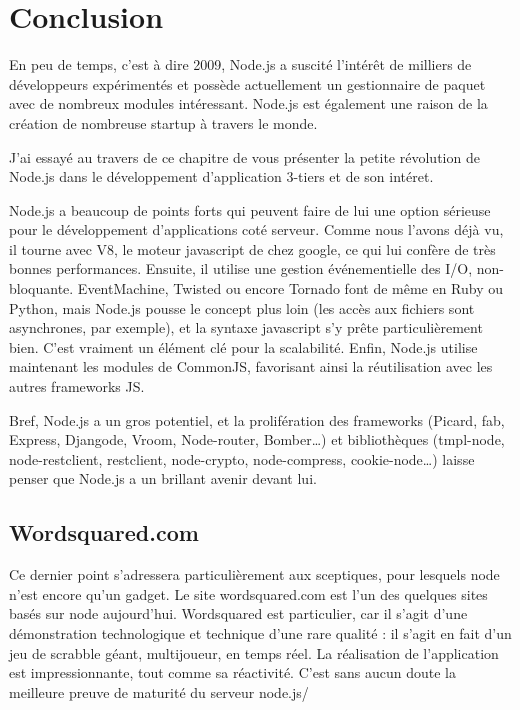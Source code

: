 \section{Conclusion}
\label{ch:conclusion serveur}

En peu de temps, c’est à dire 2009, Node.js a suscité l'intérêt de milliers de développeurs expérimentés et possède actuellement un gestionnaire de paquet avec de nombreux modules intéressant. Node.js est également une raison de la création de nombreuse startup à travers le monde.

J’ai essayé au travers de ce chapitre de vous présenter la petite révolution de Node.js dans le développement d’application 3-tiers et de son intéret.

Node.js a beaucoup de points forts qui peuvent faire de lui une option sérieuse pour le développement d'applications coté serveur. Comme nous l’avons déjà vu, il tourne avec V8, le moteur javascript de chez google, ce qui lui confère de très bonnes performances. Ensuite, il utilise une gestion événementielle des I/O, non-bloquante. EventMachine, Twisted ou encore Tornado font de même en Ruby ou Python, mais Node.js pousse le concept plus loin (les accès aux fichiers sont asynchrones, par exemple), et la syntaxe javascript s'y prête particulièrement bien. C'est vraiment un élément clé pour la scalabilité. Enfin, Node.js utilise maintenant les modules de CommonJS, favorisant ainsi la réutilisation avec les autres frameworks JS.

Bref, Node.js a un gros potentiel, et la prolifération des frameworks (Picard, fab, Express, Djangode, Vroom, Node-router, Bomber…) et bibliothèques (tmpl-node, node-restclient, restclient, node-crypto, node-compress, cookie-node…) laisse penser que Node.js a un brillant avenir devant lui.

\subsection{Wordsquared.com}

Ce dernier point s'adressera particulièrement aux sceptiques, pour lesquels node n'est encore qu'un gadget. Le site wordsquared.com est l'un des quelques sites basés sur node aujourd'hui. Wordsquared est particulier, car il s'agit d'une démonstration technologique et technique d'une rare qualité : il s'agit en fait d'un jeu de scrabble géant, multijoueur, en temps réel. La réalisation de l'application est impressionnante, tout comme sa réactivité. C'est sans aucun doute la meilleure preuve de maturité du serveur node.js/